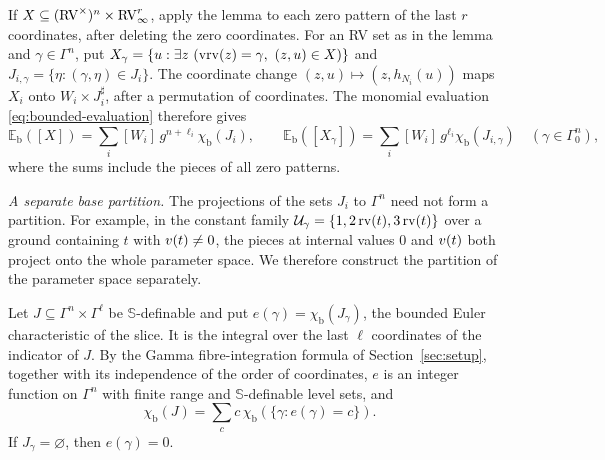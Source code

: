 If $X\subseteq(\mathrm{RV}^\times)^n\times\mathrm{RV}_\infty^r$, apply the lemma to each
zero pattern of the last $r$ coordinates, after deleting the zero coordinates.
For an RV set as in the lemma and $\gamma\in\Gamma^n$, put
$X_\gamma=\{u:\exists z\ (\vrv(z)=\gamma,\ (z,u)\in X)\}$ and
$J_{i,\gamma}=\{\eta:(\gamma,\eta)\in J_i\}$. The coordinate change
$(z,u)\mapsto(z,h_{N_i}(u))$ maps $X_i$ onto $W_i\times J_i^\sharp$, after a
permutation of coordinates. The monomial evaluation
\eqref{eq:bounded-evaluation} therefore gives
\begin{equation}\label{relative:chart:values}
 \mathbb E_{\mathrm b}([X])
   =\sum_i[W_i]\,g^{n+\ell_i}\chi_{\mathrm b}(J_i),
 \qquad
 \mathbb E_{\mathrm b}([X_\gamma])
   =\sum_i[W_i]\,g^{\ell_i}\chi_{\mathrm b}(J_{i,\gamma})
 \quad(\gamma\in\Gamma_0^n),
\end{equation}
where the sums include the pieces of all zero patterns.

\medskip
\noindent\emph{A separate base partition.}
The projections of the sets $J_i$ to $\Gamma^n$ need not form a partition.
For example, in the constant family $\mathcal U_\gamma=\{1,2\operatorname{rv}(t),3\operatorname{rv}(t)\}$
over a ground containing $t$ with $v(t)\neq0$, the pieces at internal values
$0$ and $v(t)$ both project onto the whole parameter space. We therefore
construct the partition of the parameter space separately.

Let $J\subseteq\Gamma^n\times\Gamma^\ell$ be $\mathbb S$-definable and put
$e(\gamma)=\chi_{\mathrm b}(J_\gamma)$, the bounded Euler characteristic of
the slice. It is the integral over the last $\ell$ coordinates of the
indicator of $J$. By the Gamma fibre-integration formula of
Section~\ref{sec:setup}, together with its independence of the order of
coordinates, $e$ is an integer function on $\Gamma^n$ with finite range and
$\mathbb S$-definable level sets, and
\begin{equation}\label{gamma:projection:formula}
 \chi_{\mathrm b}(J)=\sum_{c}c\,\chi_{\mathrm b}(\{\gamma:e(\gamma)=c\}).
\end{equation}
If $J_\gamma=\varnothing$, then $e(\gamma)=0$.

